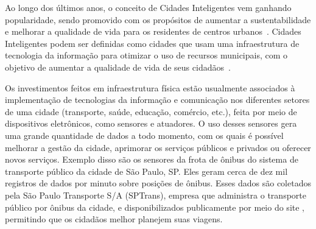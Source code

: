 

Ao longo dos últimos anos, o conceito de Cidades Inteligentes vem ganhando popularidade, sendo promovido com os propósitos de aumentar a sustentabilidade e melhorar a qualidade de vida para os residentes de centros urbanos~\citep{kon2016cidades}. Cidades Inteligentes podem ser definidas como cidades que usam uma infraestrutura de tecnologia da informação para otimizar o uso de recursos municipais, com o objetivo de aumentar a qualidade de vida de seus cidadãos~\citep{doi:10.1080/10630732.2011.601117}. 

Os investimentos feitos em infraestrutura física estão usualmente associados à implementação de tecnologias da informação e comunicação nos diferentes setores de uma cidade (transporte, saúde, educação, comércio, etc.), feita por meio de dispositivos eletrônicos, como sensores e atuadores. 
O uso desses sensores gera uma grande quantidade de dados a todo momento, com os quais é possível melhorar a gestão da cidade, aprimorar os serviços públicos e privados ou oferecer novos serviços.
Exemplo disso são os sensores da frota de ônibus do sistema de transporte público da cidade de São Paulo, SP.  Eles geram cerca de dez mil registros de dados por minuto sobre posições de ônibus.  Esses dados são coletados pela São Paulo Transporte S/A (SPTrans), empresa que administra o transporte público por ônibus da cidade, e disponibilizados publicamente por meio do site \cite{Olhovivo}, permitindo que os cidadãos melhor planejem suas viagens.






